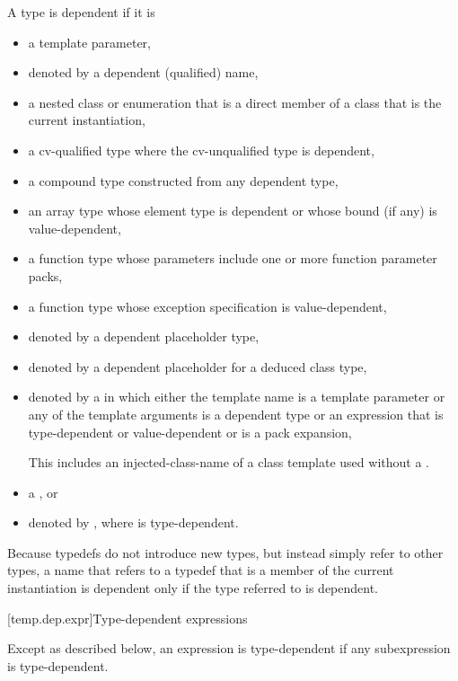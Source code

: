 \pnum
A type is dependent if it is
\begin{itemize}
\item
a template parameter,
\item
denoted by a dependent (qualified) name,
\item
a nested class or enumeration that is a direct member of
a class that is the current instantiation,
\item
a cv-qualified type where the cv-unqualified type is dependent,
\item
a compound type constructed from any dependent type,
\item
an array type whose element type is dependent or whose
bound (if any) is value-dependent,
\item
a function type whose parameters include one or more function parameter packs,
\item
a function type whose exception specification is value-dependent,
\item
denoted by a dependent placeholder type,
\item
denoted by a dependent placeholder for a deduced class type,
\item
denoted by a 
in which either the template name is a template parameter or any of the
template arguments is a dependent type or an expression that is type-dependent
or value-dependent or is a pack expansion,
\begin{footnote}
This includes an injected-class-name of a class template
used without a .
\end{footnote}
\item a , or
\item denoted by \tcode{)},
where  is type-dependent.
\end{itemize}

\pnum
\begin{note}
Because typedefs do not introduce new types, but
instead simply refer to other types, a name that refers to a
typedef that is a member of the current instantiation is dependent
only if the type referred to is dependent.
\end{note}

[temp.dep.expr]{Type-dependent expressions}

\pnum
Except as described below, an expression is type-dependent if any
subexpression is type-dependent.

